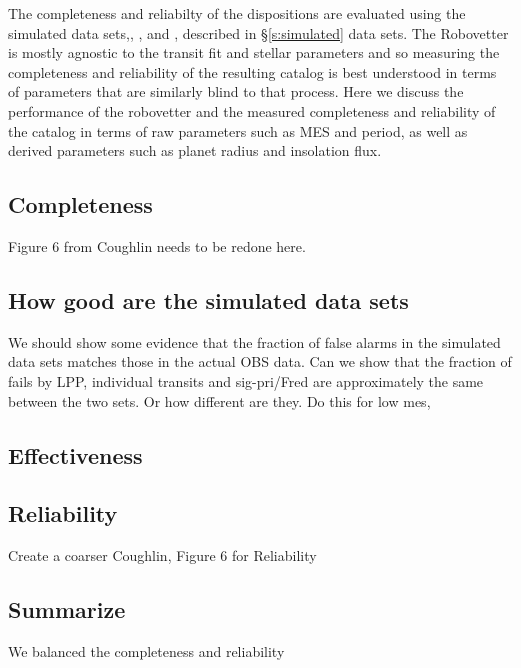 
The completeness and reliabilty of the dispositions are evaluated using the simulated data sets,\injtce, \invtce, and \scrtce, described in \S\ref{s:simulated}  data sets. The Robovetter is mostly agnostic to the transit fit and stellar parameters and so measuring the completeness and reliability of the resulting catalog is best understood in terms of parameters that are similarly blind to that process.  Here we discuss the performance of the robovetter and the measured completeness and reliability of the catalog in terms of raw parameters such as MES and period, as well as derived parameters such as planet radius and insolation flux. 

\subsection{Completeness}
Figure 6 from Coughlin needs to be redone here.


\subsection{How good are the simulated data sets}
We should show some evidence that the fraction of false alarms in the simulated data sets matches those in the actual OBS data.  Can we show that the fraction of fails by LPP, individual transits and sig-pri/Fred are approximately the same between the two sets.  Or how different are they.  Do this for low mes,

\subsection{Effectiveness}

\subsection{Reliability}
Create a coarser Coughlin, Figure 6 for Reliability 


\subsection{Summarize}
We balanced the completeness and reliability

